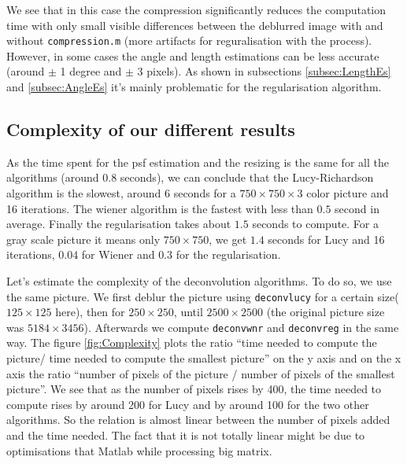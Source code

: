 We see that in this case the compression significantly reduces the computation time with only small visible differences between the deblurred image with and without \texttt{compression.m} (more artifacts for reguralisation with the  process). 
However, in some cases the angle and length estimations can be less accurate (around $\pm$ 1 degree and $\pm$ 3 pixels). As shown in subsections \ref{subsec:LengthEs} and \ref{subsec:AngleEs} it's mainly problematic for the regularisation algorithm.

\subsection{Complexity of our different results}

As the time spent for the psf estimation and the resizing is the same for all the algorithms (around 0.8 seconds), we can conclude that the Lucy-Richardson algorithm is the slowest, around $6 $ seconds for a $750 \times 750 \times 3$ color picture and 16 iterations. The wiener algorithm is the fastest with less than $0.5$ second in average. Finally the regularisation takes about $1.5$ seconds to compute. For a gray scale picture it means only $750 \times 750$, we get $1.4$ seconds for Lucy and 16 iterations, $0.04$ for Wiener and $0.3$ for the regularisation. 

Let's estimate the complexity of the deconvolution algorithms. To do so, we use the same picture. We first deblur the picture using \texttt{deconvlucy} for a certain size($125 \times 125$ here), then for $250 \times 250$, until $2500 \times 2500$ (the original picture  size was $5184 \times 3456$). Afterwards we compute  \texttt{deconvwnr} and \texttt{deconvreg} in the same way. The figure \ref{fig:Complexity} plots the ratio ``time needed to compute the picture/ time needed to compute the smallest picture'' on the y axis and on the x axis the ratio ``number of pixels of the picture / number of pixels of the smallest picture''. We see that as the number of pixels rises by 400, the time needed to compute rises by around 200 for Lucy and by around 100 for the two other algorithms. So the relation is almost linear between the number of pixels added and the time needed. The fact that it is not totally linear might be due to optimisations that Matlab while processing big matrix. 


